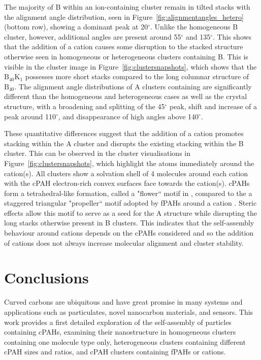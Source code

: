 The majority of B within an ion-containing cluster remain in tilted stacks with the alignment angle distribution, seen in Figure~\ref{fig:alignmentangles_hetero} (bottom row), showing a dominant peak at 20$^{\circ}$. Unlike the homogeneous B cluster, however, additional angles are present around 55$^{\circ}$ and 135$^{\circ}$. This shows that the addition of a cation causes some disruption to the stacked structure otherwise seen in homogeneous or heterogeneous clusters containing B. This is visible in the cluster image in Figure~\ref{fig:clustersnapshots}, which shows that the $\text{B}_{\text{40}}\text{K}_{\text{1}}$ possesses more short stacks compared to the long columnar structure of $\text{B}_{\text{40}}$.  The alignment angle distributions of A clusters containing  are significantly different than the homogeneous and heterogeneous cases as well as the crystal structure, with a broadening and splitting of the 45$^{\circ}$ peak, shift and increase of a peak around 110$^{\circ}$, and disappearance of high angles above 140$^{\circ}$.

These quantitative differences suggest that the addition of a cation promotes stacking within the A cluster and disrupts the existing stacking within the B cluster. This can be observed in the cluster visualisations in Figure~\ref{fig:clustersnapshots}, which highlight the atoms immediately around the cation(s). All clusters show a solvation shell of 4 molecules around each cation with the cPAH electron-rich convex surfaces face towards the cation(s). cPAHs form a tetrahedral-like formation, called a "flower`` motif in \citet{bowal2019ion}, compared to the a staggered triangular "propeller`` motif adopted by fPAHs around a cation \cite{bartolomei2019aggregation}. Steric effects allow this motif to serve as a seed for the A structure while disrupting the long stacks otherwise present in B clusters. This indicates that the self-assembly behaviour around cations depends on the cPAHs considered and so the addition of cations does not always increase molecular alignment and cluster stability.

\section{Conclusions}
Curved carbons are ubiquitous and have great promise in many systems and applications such as particulates, novel nanocarbon materials, and sensors. This work provides a first detailed exploration of the self-assembly of particles containing cPAHs, examining their nanostructure in homogeneous clusters containing one molecule type only, heterogeneous clusters containing different cPAH sizes and ratios, and cPAH clusters containing fPAHs or cations.

